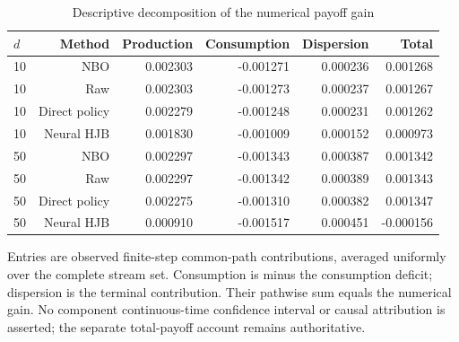 \begin{table}[!htbp]
\centering\small
\caption{Descriptive decomposition of the numerical payoff gain}
\label{tab:r15methoddecomposition}
\begin{tabular}{lrrrrr}
\toprule
$d$ & Method & Production & Consumption & Dispersion & Total \\
\midrule
10 & NBO & 0.002303 & -0.001271 & 0.000236 & 0.001268 \\
10 & Raw & 0.002303 & -0.001273 & 0.000237 & 0.001267 \\
10 & Direct policy & 0.002279 & -0.001248 & 0.000231 & 0.001262 \\
10 & Neural HJB & 0.001830 & -0.001009 & 0.000152 & 0.000973 \\
50 & NBO & 0.002297 & -0.001343 & 0.000387 & 0.001342 \\
50 & Raw & 0.002297 & -0.001342 & 0.000389 & 0.001343 \\
50 & Direct policy & 0.002275 & -0.001310 & 0.000382 & 0.001347 \\
50 & Neural HJB & 0.000910 & -0.001517 & 0.000451 & -0.000156 \\
\bottomrule
\end{tabular}
\par\medskip\noindent\footnotesize Entries are observed finite-step common-path contributions, averaged uniformly over the complete stream set. Consumption is minus the consumption deficit; dispersion is the terminal contribution. Their pathwise sum equals the numerical gain. No component continuous-time confidence interval or causal attribution is asserted; the separate total-payoff account remains authoritative.
\end{table}
